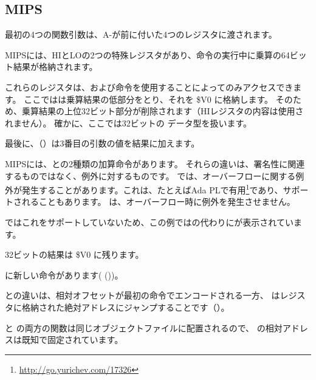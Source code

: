 \subsection{MIPS}



最初の4つの関数引数は、A-が前に付いた4つのレジスタに渡されます。


MIPSには、HIとLOの2つの特殊レジスタがあり、命令の実行中に乗算の64ビット結果が格納されます。


これらのレジスタは、および命令を使用することによってのみアクセスできます。
ここではは乗算結果の低部分をとり、それを \$V0 に格納します。
そのため、乗算結果の上位32ビット部分が削除されます（HIレジスタの内容は使用されません）。
確かに、ここでは32ビットの \Tint データ型を扱います。


最後に、（）は3番目の引数の値を結果に加えます。


MIPSには、との2種類の加算命令があります。
それらの違いは、署名性に関連するものではなく、例外に対するものです。 では、オーバーフローに関する例外が発生することがあります。これは、たとえばAda \ac{PL}で有用\footnote{\url{http://go.yurichev.com/17326}}であり、サポートされることもあります。 
は、オーバーフロー時に例外を発生させません。

\CCpp ではこれをサポートしていないため、この例ではの代わりにが表示されています。

32ビットの結果は \$V0 に残ります。


\main に新しい命令があります( ())。

との違いは、相対オフセットが最初の命令でエンコードされる一方、
はレジスタに格納された絶対アドレスにジャンプすることです（）。

\ttf と \main の両方の関数は同じオブジェクトファイルに配置されるので、 
\ttf の相対アドレスは既知で固定されています。
